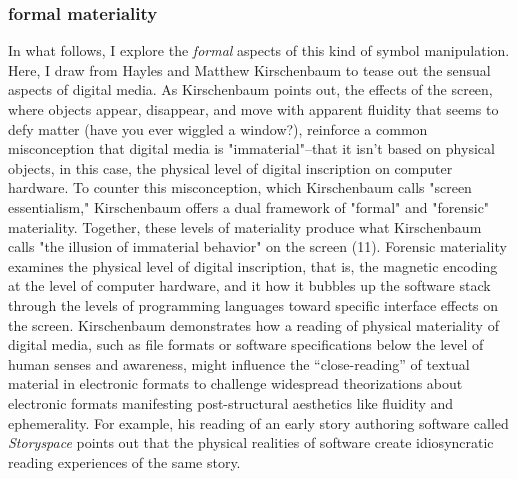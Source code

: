 \documentclass[11pt]{article}
\begin{document}
\subsubsection{formal materiality}
\label{sec:org35eb98f}
In what follows, I explore the \emph{formal} aspects of this kind of symbol
manipulation. Here, I draw from Hayles and Matthew Kirschenbaum to
tease out the sensual aspects of digital media. As Kirschenbaum points
out, the effects of the screen, where objects appear, disappear, and
move with apparent fluidity that seems to defy matter (have you ever
wiggled a window?), reinforce a common misconception that digital
media is "immaterial"--that it isn't based on physical objects, in
this case, the physical level of digital inscription on computer
hardware. To counter this misconception, which Kirschenbaum calls
"screen essentialism," Kirschenbaum offers a dual framework of
"formal" and "forensic" materiality. Together, these levels of
materiality produce what Kirschenbaum calls "the illusion of
immaterial behavior" on the screen (11). Forensic materiality examines
the physical level of digital inscription, that is, the magnetic
encoding at the level of computer hardware, and it how it bubbles up
the software stack through the levels of programming languages toward
specific interface effects on the screen. Kirschenbaum demonstrates
how a reading of physical materiality of digital media, such as file
formats or software specifications below the level of human senses and
awareness, might influence the “close-reading” of textual material in
electronic formats to challenge widespread theorizations about
electronic formats manifesting post-structural aesthetics like
fluidity and ephemerality. For example, his reading of an early story
authoring software called \emph{Storyspace} points out that the physical
realities of software create idiosyncratic reading experiences of the
same story.
\end{document}
